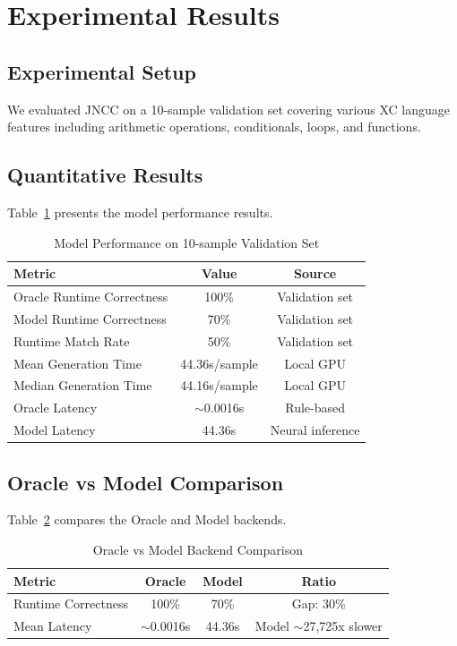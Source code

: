 \documentclass[12pt, a4paper, submitted, nofoot]{JNCCtemplate}
\begin{document}
\section{Experimental Results}

\subsection{Experimental Setup}

We evaluated JNCC on a 10-sample validation set covering various XC language features including arithmetic operations, conditionals, loops, and functions.

\subsection{Quantitative Results}

Table~\ref{tab:results} presents the model performance results.

\begin{table}[h]
\centering
\caption{Model Performance on 10-sample Validation Set}
\begin{tabular}{@{}lcc@{}}
\toprule
\textbf{Metric} & \textbf{Value} & \textbf{Source} \\
\midrule
Oracle Runtime Correctness & 100\% & Validation set \\
Model Runtime Correctness & 70\% & Validation set \\
Runtime Match Rate & 50\% & Validation set \\
Mean Generation Time & 44.36s/sample & Local GPU \\
Median Generation Time & 44.16s/sample & Local GPU \\
Oracle Latency & $\sim$0.0016s & Rule-based \\
Model Latency & 44.36s & Neural inference \\
\midrule
\end{tabular}
\label{tab:results}
\end{table}

\subsection{Oracle vs Model Comparison}

Table~\ref{tab:comparison} compares the Oracle and Model backends.

\begin{table}[h]
\centering
\caption{Oracle vs Model Backend Comparison}
\begin{tabular}{@{}lccc@{}}
\toprule
\textbf{Metric} & \textbf{Oracle} & \textbf{Model} & \textbf{Ratio} \\
\midrule
Runtime Correctness & 100\% & 70\% & Gap: 30\% \\
Mean Latency & $\sim$0.0016s & 44.36s & Model $\sim$27,725x slower \\
\midrule
\end{tabular}
\label{tab:comparison}
\end{table}
\end{document}
